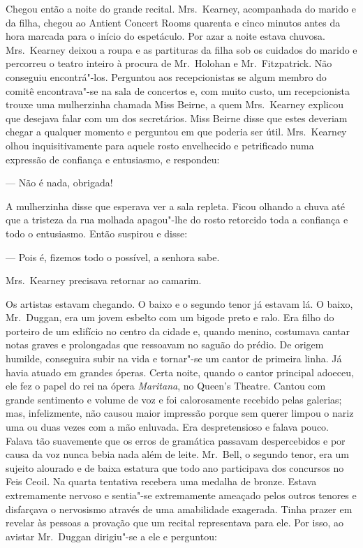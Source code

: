 Chegou então a noite do grande recital.  Mrs.~Kearney, acompanhada do marido e
da filha, chegou ao Antient Concert Rooms quarenta e cinco minutos antes da
hora marcada para o início do espetáculo.  Por azar a noite estava chuvosa.
Mrs.~Kearney deixou a roupa e as partituras da filha sob os cuidados do marido
e percorreu o teatro inteiro à procura de Mr.~Holohan e Mr.~Fitzpatrick.  Não
conseguiu encontrá"-los.  Perguntou aos recepcionistas se algum membro do comitê
encontrava"-se na sala de concertos e, com muito custo, um recepcionista trouxe
uma mulherzinha chamada Miss Beirne, a quem Mrs.~Kearney explicou que desejava
falar com um dos secretários.  Miss Beirne disse que estes deveriam chegar a
qualquer momento e perguntou em que poderia ser útil.  Mrs.~Kearney olhou
inquisitivamente para aquele rosto envelhecido e petrificado numa expressão de
confiança e entusiasmo, e respondeu:

--- Não é nada, obrigada!

A mulherzinha disse que esperava ver a sala repleta.  Ficou olhando a chuva até
que a tristeza da rua molhada apagou"-lhe do rosto retorcido toda a confiança e
todo o entusiasmo.  Então suspirou e disse:

--- Pois é, fizemos todo o possível, a senhora sabe.

Mrs.~Kearney precisava retornar ao camarim.

Os artistas estavam chegando.  O baixo e o segundo tenor já estavam lá.  O
baixo, Mr.~Duggan, era um jovem esbelto com um bigode preto e ralo.  Era filho
do porteiro de um edifício no centro da cidade e, quando menino, costumava
cantar notas graves e prolongadas que ressoavam no saguão do prédio.  De origem
humilde, conseguira subir na vida e tornar"-se um cantor de primeira linha.  Já
havia atuado em grandes óperas.  Certa noite, quando o cantor principal
adoeceu, ele fez o papel do rei na ópera \textit{Maritana}, no Queen’s Theatre.
Cantou com grande sentimento e volume de voz e foi calorosamente recebido pelas
galerias; mas, infelizmente, não causou maior impressão porque sem querer
limpou o nariz uma ou duas vezes com a mão enluvada.  Era despretensioso e
falava pouco.  Falava tão suavemente que os erros de gramática passavam
despercebidos e por causa da voz nunca bebia nada além de leite.  Mr.~Bell, o
segundo tenor, era um sujeito alourado e de baixa estatura que todo ano
participava dos concursos no Feis Ceoil.  Na quarta tentativa recebera uma
medalha de bronze.  Estava extremamente nervoso e sentia"-se extremamente
ameaçado pelos outros tenores e disfarçava o nervosismo através de uma
amabilidade exagerada.  Tinha prazer em revelar às pessoas a provação que um
recital representava para ele.  Por isso, ao avistar Mr.~Duggan dirigiu"-se a
ele e perguntou:

